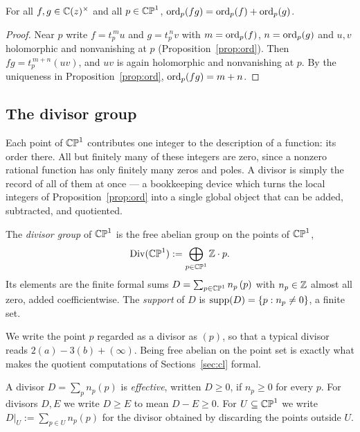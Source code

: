 \begin{smjproposition}\label{prop:ordhom}
For all $f, g \in \mathbb{C}(z)^\times$ and all $p \in \mathbb{CP}^1$,
$\operatorname{ord}_p(fg) = \operatorname{ord}_p(f) + \operatorname{ord}_p(g)$.
\end{smjproposition}

\begin{proof}
Near $p$ write $f = t_p^{\,m} u$ and $g = t_p^{\,n} v$ with $m = \operatorname{ord}_p(f)$,
$n = \operatorname{ord}_p(g)$ and $u, v$ holomorphic and nonvanishing at $p$
(Proposition~\ref{prop:ord}). Then $fg = t_p^{\,m+n}(uv)$, and $uv$ is again
holomorphic and nonvanishing at $p$. By the uniqueness in
Proposition~\ref{prop:ord}, $\operatorname{ord}_p(fg) = m+n$.
\end{proof}

\subsection{The divisor group}

Each point of $\mathbb{CP}^1$ contributes one integer to the description of a function: its
order there. All but finitely many of these integers are zero, since a nonzero
rational function has only finitely many zeros and poles. A divisor is simply the
record of all of them at once --- a bookkeeping device which turns the local
integers of Proposition~\ref{prop:ord} into a single global object that can be
added, subtracted, and quotiented.

\begin{definition}
The \emph{divisor group} of $\mathbb{CP}^1$ is the free abelian group on the points of
$\mathbb{CP}^1$,
\[
\operatorname{Div}(\mathbb{CP}^1) := \bigoplus_{p \in \mathbb{CP}^1} \mathbb{Z} \cdot p .
\]
Its elements are the finite formal sums $D = \sum_{p \in \mathbb{CP}^1} n_p\,(p)$ with
$n_p \in \mathbb{Z}$ almost all zero, added coefficientwise. The \emph{support} of $D$
is $\operatorname{supp}(D) = \{p : n_p \neq 0\}$, a finite set.
\end{definition}

We write the point $p$ regarded as a divisor as $(p)$, so that a typical divisor
reads $2(a) - 3(b) + (\infty)$. Being free abelian on the point set is exactly
what makes the quotient computations of Sections~\ref{sec:cl} formal.

\begin{definition}\label{def:effective}
A divisor $D = \sum_p n_p (p)$ is \emph{effective}, written $D \geq 0$, if
$n_p \geq 0$ for every $p$. For divisors $D, E$ we write $D \geq E$ to mean
$D - E \geq 0$. For $U \subseteq \mathbb{CP}^1$ we write $D|_U := \sum_{p \in U} n_p (p)$
for the divisor obtained by discarding the points outside $U$.
\end{definition}

